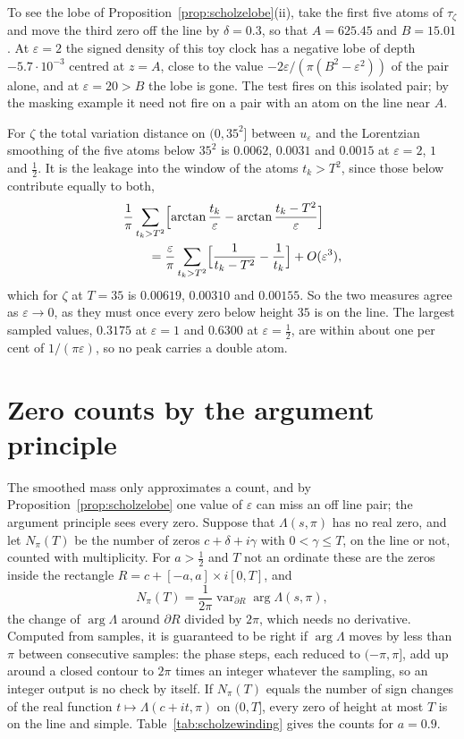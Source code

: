 To see the lobe of Proposition~\ref{prop:scholzelobe}(ii), take the first five atoms of $\tau_\zeta$ and move the third zero off the line by $\delta=0.3$, so that $A=625.45$ and $B=15.01$. At $\varepsilon=2$ the signed density of this toy clock has a negative lobe of depth $-5.7\cdot10^{-3}$ centred at $z=A$, close to the value $-2\varepsilon/(\pi(B^2-\varepsilon^2))$ of the pair alone, and at $\varepsilon=20>B$ the lobe is gone. The test fires on this isolated pair; by the masking example it need not fire on a pair with an atom on the line near $A$.

For $\zeta$ the total variation distance on $(0,35^2]$ between $u_\varepsilon$ and the Lorentzian smoothing of the five atoms below $35^2$ is $0.0062$, $0.0031$ and $0.0015$ at $\varepsilon=2$, $1$ and $\frac12$. It is the leakage into the window of the atoms $t_k>T^2$, since those below contribute equally to both,
\begin{align*}
&\frac1\pi\sum_{t_k>T^2}\Bigl[\arctan\frac{t_k}\varepsilon-\arctan\frac{t_k-T^2}\varepsilon\Bigr]\\
&\qquad=\frac\varepsilon\pi\sum_{t_k>T^2}\Bigl[\frac1{t_k-T^2}-\frac1{t_k}\Bigr]+O(\varepsilon^3),
\end{align*}
which for $\zeta$ at $T=35$ is $0.00619$, $0.00310$ and $0.00155$. So the two measures agree as $\varepsilon\to0$, as they must once every zero below height $35$ is on the line. The largest sampled values, $0.3175$ at $\varepsilon=1$ and $0.6300$ at $\varepsilon=\frac12$, are within about one per cent of $1/(\pi\varepsilon)$, so no peak carries a double atom.

\section{Zero counts by the argument principle}\label{sec:scholzewinding}

The smoothed mass only approximates a count, and by Proposition~\ref{prop:scholzelobe} one value of $\varepsilon$ can miss an off line pair; the argument principle sees every zero. Suppose that $\Lambda(s,\pi)$ has no real zero, and let $N_\pi(T)$ be the number of zeros $c+\delta+i\gamma$ with $0<\gamma\le T$, on the line or not, counted with multiplicity. For $a>\frac12$ and $T$ not an ordinate these are the zeros inside the rectangle $R=c+[-a,a]\times i[0,T]$, and
\[
N_\pi(T)=\frac1{2\pi}\operatorname{var}_{\partial R}\arg\Lambda(s,\pi),
\]
the change of $\arg\Lambda$ around $\partial R$ divided by $2\pi$, which needs no derivative. Computed from samples, it is guaranteed to be right if $\arg\Lambda$ moves by less than $\pi$ between consecutive samples: the phase steps, each reduced to $(-\pi,\pi]$, add up around a closed contour to $2\pi$ times an integer whatever the sampling, so an integer output is no check by itself. If $N_\pi(T)$ equals the number of sign changes of the real function $t\mapsto\Lambda(c+it,\pi)$ on $(0,T]$, every zero of height at most $T$ is on the line and simple. Table~\ref{tab:scholzewinding} gives the counts for $a=0.9$.

